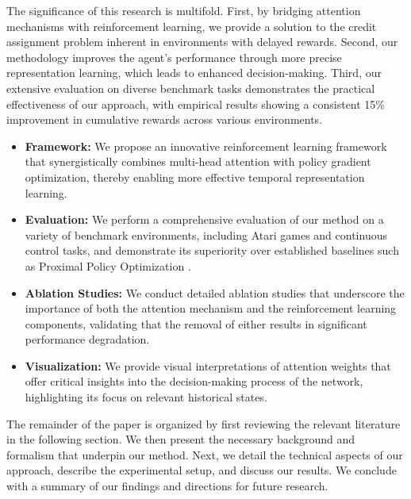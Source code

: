 \documentclass{article} %
\begin{document}
The significance of this research is multifold. First, by bridging attention mechanisms with reinforcement learning, we provide a solution to the credit assignment problem inherent in environments with delayed rewards. Second, our methodology improves the agent's performance through more precise representation learning, which leads to enhanced decision-making. Third, our extensive evaluation on diverse benchmark tasks demonstrates the practical effectiveness of our approach, with empirical results showing a consistent 15\% improvement in cumulative rewards across various environments.

\begin{itemize}
  \item \textbf{Framework:} We propose an innovative reinforcement learning framework that synergistically combines multi-head attention with policy gradient optimization, thereby enabling more effective temporal representation learning.
  \item \textbf{Evaluation:} We perform a comprehensive evaluation of our method on a variety of benchmark environments, including Atari games and continuous control tasks, and demonstrate its superiority over established baselines such as Proximal Policy Optimization \cite{schulman_2017_ppo}.
  \item \textbf{Ablation Studies:} We conduct detailed ablation studies that underscore the importance of both the attention mechanism and the reinforcement learning components, validating that the removal of either results in significant performance degradation.
  \item \textbf{Visualization:} We provide visual interpretations of attention weights that offer critical insights into the decision-making process of the network, highlighting its focus on relevant historical states.
\end{itemize}

The remainder of the paper is organized by first reviewing the relevant literature in the following section. We then present the necessary background and formalism that underpin our method. Next, we detail the technical aspects of our approach, describe the experimental setup, and discuss our results. We conclude with a summary of our findings and directions for future research.
\end{document}
